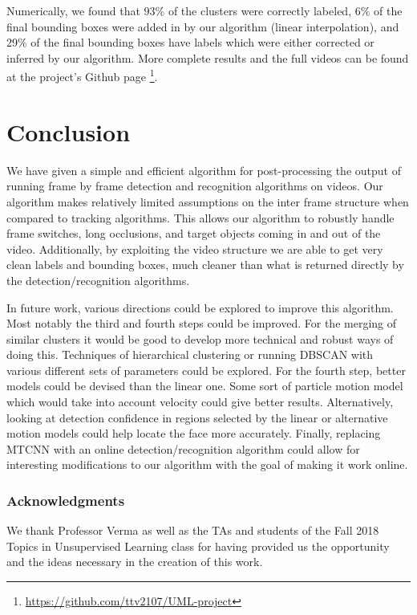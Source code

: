 \documentclass{article}
\begin{document}
Numerically, we found that 93\% of the clusters were correctly labeled, 6\% of the final bounding boxes were added in by our algorithm (linear interpolation), and 29\% of the final bounding boxes have
labels which were either corrected or inferred by our algorithm. More complete results and the full videos can be found at the project's Github page \footnote{\url{https://github.com/ttv2107/UML-project}}.

\section{Conclusion}
We have given a simple and efficient algorithm for post-processing the output of running frame by frame detection and recognition algorithms on videos. Our algorithm makes
relatively limited assumptions on the inter frame structure when compared to tracking algorithms. This allows our algorithm to robustly handle frame switches, long occlusions, and
target objects coming in and out of the video. Additionally, by exploiting the video structure we are able to get very clean labels and bounding boxes, much cleaner than what is
returned directly by the
detection/recognition algorithms.

In future work, various directions could be explored to improve this algorithm. Most notably the third and fourth steps could be improved. For the merging of similar clusters it would be good
to develop more technical and robust ways of doing this. Techniques of hierarchical clustering or running DBSCAN with various different sets of parameters could be explored. For the fourth step,
better models could be devised than the linear one. Some sort of particle motion model which would take into account velocity could give better results. Alternatively, looking at detection confidence in
regions selected by the linear or alternative motion models could help locate the face more accurately. Finally, replacing MTCNN with an online detection/recognition algorithm could allow for interesting
modifications to our algorithm with the goal of making it work online.

\subsubsection*{Acknowledgments}

We thank Professor Verma as well as the TAs and students of the Fall 2018 Topics in Unsupervised Learning class for having provided us the opportunity
and the ideas necessary in the creation of this work.

\newpage


\end{document}
